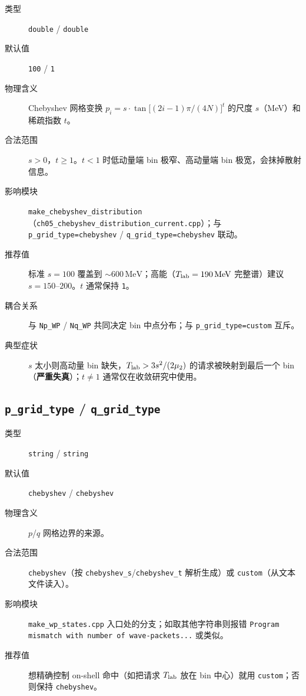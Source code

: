 \begin{description}
  \item[类型] \texttt{double} / \texttt{double}
  \item[默认值] \texttt{100} / \texttt{1}
  \item[物理含义] Chebyshev 网格变换 \(p_i = s\cdot\tan\!\big[(2i-1)\pi/(4N)\big]^{t}\) 的尺度 \(s\)（\si{MeV}）和稀疏指数 \(t\)。
  \item[合法范围] \(s>0\)，\(t\ge 1\)。\(t<1\) 时低动量端 bin 极窄、高动量端 bin 极宽，会抹掉散射信息。
  \item[影响模块] \texttt{make\_chebyshev\_distribution}（\texttt{ch05\_chebyshev\_distribution\_current.cpp}）；与 \texttt{p\_grid\_type=chebyshev} / \texttt{q\_grid\_type=chebyshev} 联动。
  \item[推荐值] 标准 \(s=100\) 覆盖到 \(\sim 600\,\mathrm{MeV}\)；高能（\({T_{\text{lab}}}=190\,\mathrm{MeV}\) 完整谱）建议 \(s=150\)–\(200\)。\(t\) 通常保持 \texttt{1}。
  \item[耦合关系] 与 \texttt{Np\_WP} / \texttt{Nq\_WP} 共同决定 bin 中点分布；与 \texttt{p\_grid\_type=custom} 互斥。
  \item[典型症状] \(s\) 太小则高动量 bin 缺失，\({T_{\text{lab}}}>3 s^2/(2\mu_2)\) 的请求被映射到最后一个 bin（\textbf{严重失真}）；\(t\ne 1\) 通常仅在收敛研究中使用。
\end{description}

\subsection{\texttt{p\_grid\_type} / \texttt{q\_grid\_type}}

\begin{description}
  \item[类型] \texttt{string} / \texttt{string}
  \item[默认值] \texttt{chebyshev} / \texttt{chebyshev}
  \item[物理含义] \(p\)/\(q\) 网格边界的来源。
  \item[合法范围] \texttt{chebyshev}（按 \texttt{chebyshev\_s}/\texttt{chebyshev\_t} 解析生成）或 \texttt{custom}（从文本文件读入）。
  \item[影响模块] \texttt{make\_wp\_states.cpp} 入口处的分支；如取其他字符串则报错 \texttt{Program mismatch with number of wave-packets...} 或类似。
  \item[推荐值] 想精确控制 on-shell 命中（如把请求 \({T_{\text{lab}}}\) 放在 bin 中心）就用 \texttt{custom}；否则保持 \texttt{chebyshev}。
\end{description}

